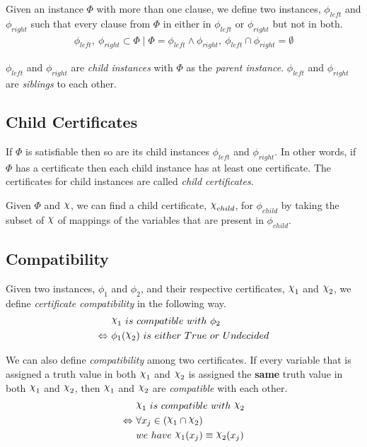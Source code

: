 Given an instance $\Phi$ with more than one clause, we define two instances, $\phi_{left}$ and $\phi_{right}$ such that every clause from $\Phi$ in either in $\phi_{left}$ or $\phi_{right}$ but not in both.
\begin{align*}
    \phi_{left},~ \phi_{right} \subset \Phi
    \mid \Phi = \phi_{left} \land \phi_{right},~
    \phi_{left} \cap \phi_{right} = \emptyset
\end{align*}

$\phi_{left}$ and $\phi_{right}$ are \textit{child instances} with $\Phi$ as the \textit{parent instance}.
$\phi_{left}$ and $\phi_{right}$ are \textit{siblings} to each other.


\subsection{Child Certificates}
\label{subsec:child-certificates}

If $\Phi$ is satisfiable then so are its child instances $\phi_{left}$ and $\phi_{right}$.
In other words, if $\Phi$ has a certificate then each child instance has at least one certificate.
The certificates for child instances are called \textit{child certificates}.

Given $\Phi$ and $\rchi$, we can find a child certificate, $\rchi_{child}$, for $\phi_{child}$ by taking the subset of $\rchi$ of mappings of the variables that are present in $\phi_{child}$.


\subsection{Compatibility}
\label{subsec:compatibility}

Given two instances, $\phi_1$ and $\phi_2$, and their respective certificates, $\rchi_1$ and $\rchi_2$, we define \textit{certificate compatibility} in the following way.
\begin{align*}
    & \rchi_1~ is~ compatible~ with~ \phi_2 \\
    \Leftrightarrow~ & \phi_1(\rchi_2)~ is~ either~ True~ or~ Undecided
\end{align*}

We can also define \textit{compatibility} among two certificates.
If every variable that is assigned a truth value in both $\rchi_1$ and $\rchi_2$ is assigned the \textbf{same} truth value in both $\rchi_1$ and $\rchi_2$, then $\rchi_1$ and $\rchi_2$ are \textit{compatible} with each other.
\begin{align*}
    & \rchi_1~ is~ compatible~ with~ \rchi_2 \\
    \Leftrightarrow~ & \forall x_j \in (\rchi_1 \cap \rchi_2) \\
    & we~ have~ \rchi_1(x_j) \equiv \rchi_2(x_j)
\end{align*}

